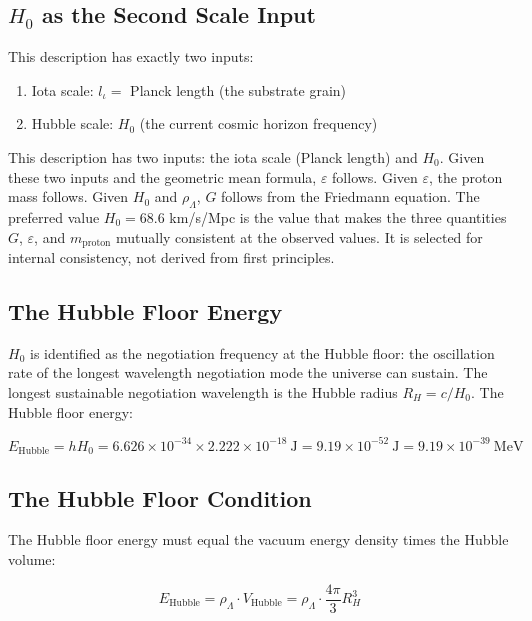 \documentclass[11pt,letterpaper]{article}
\begin{document}
\subsection{\(H_0\) as the Second Scale Input}
\label{sec:org554ebf9}

This description has exactly two inputs:

\begin{enumerate}
\item Iota scale: \(l_\iota =\) Planck length (the substrate grain)
\item Hubble scale: \(H_0\) (the current cosmic horizon frequency)
\end{enumerate}

This description has two inputs: the iota scale (Planck length) and \(H_0\). Given these two inputs and the geometric mean formula, \(\varepsilon\) follows. Given \(\varepsilon\), the proton mass follows. Given \(H_0\) and \(\rho_\Lambda\), \(G\) follows from the Friedmann equation. The preferred value \(H_0 = 68.6\) km/s/Mpc is the value that makes the three quantities \(G\), \(\varepsilon\), and \(m_\text{proton}\) mutually consistent at the observed values. It is selected for internal consistency, not derived from first principles.

\subsection{The Hubble Floor Energy}
\label{sec:orgc198ef9}

\(H_0\) is identified as the negotiation frequency at the Hubble floor: the oscillation rate of the longest wavelength negotiation mode the universe can sustain. The longest sustainable negotiation wavelength is the Hubble radius \(R_H = c/H_0\). The Hubble floor energy:

\begin{equation}
E_\text{Hubble} = hH_0 = 6.626\times10^{-34} \times 2.222\times10^{-18}\ \text{J} = 9.19 \times 10^{-52}\ \text{J} = 9.19 \times 10^{-39}\ \text{MeV}
\end{equation}

\subsection{The Hubble Floor Condition}
\label{sec:org682547e}

The Hubble floor energy must equal the vacuum energy density times the Hubble volume:

\begin{equation}
E_\text{Hubble} = \rho_\Lambda \cdot V_\text{Hubble} = \rho_\Lambda \cdot \frac{4\pi}{3} R_H^3
\end{equation}
\end{document}
